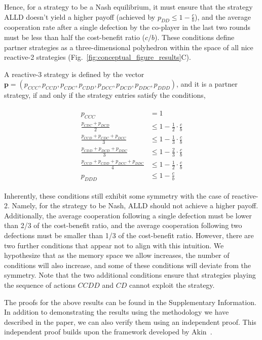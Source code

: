 \documentclass[11pt]{article}
\begin{document}
Hence, for a strategy to be a Nash equilibrium, it must ensure that the strategy
ALLD doesn't yield a higher payoff (achieved by $p_{DD} \leq 1 - \frac{c}{b}$),
and the average cooperation rate after a single defection by the co-player in
the last two rounds must be less than half the cost-benefit ratio ($c/b$). These
conditions define partner strategies as a three-dimensional polyhedron within
the space of all nice reactive-2 strategies
(Fig.~\ref{fig:conceptual_figure_results}C).

A reactive-3 strategy is defined by the vector $\mathbf{p} = (p_{CCC}, p_{CCD},
p_{CDC}, p_{CDD}, p_{DCC}, p_{DCD}, p_{DDC}, p_{DDD})$, and it is a partner strategy,
if and only if the strategy entries satisfy the conditions,

\begin{align}\label{eq:three_bit_conditions}
  \begin{split}
  p_{CCC} & = 1 \\
  \frac{p_{CDC} + p_{DCD}}{2} & \leq 1 - \frac{1}{2} \cdot \frac{c}{b} \\
  \frac{p_{CCD} + p_{CDC} + p_{DCC}}{3} & \leq 1 - \frac{1}{3} \cdot \frac{c}{b} \\
  \frac{p_{CDD} + p_{DCD} + p_{DDC}}{3} & \leq 1 - \frac{2}{3} \cdot \frac{c}{b} \\
  \frac{p_{CCD} + p_{CDD} + p_{DCC} + p_{DDC}}{4}  & \leq 1 - \frac{1}{2} \cdot \frac{c}{b}  \\
  p_{DDD} & \leq 1\!-\! \frac{c}{b}
  \end{split}
\end{align}

Inherently, these conditions still exhibit some symmetry with the case of
reactive-2. Namely, for the strategy to be Nash, ALLD should not achieve a
higher payoff. Additionally, the average cooperation following a single
defection must be lower than 2/3 of the cost-benefit ratio, and the average
cooperation following two defections must be smaller than 1/3 of the
cost-benefit ratio. However, there are two further conditions that appear not to
align with this intuition. We hypothesize that as the memory space we allow
increases, the number of conditions will also increase, and some of these
conditions will deviate from the symmetry. Note that the two additional conditions ensure
that strategies playing the sequence of actions $CCDD$ and $CD$ cannot exploit the
strategy.

The proofs for the above results can be found in the Supplementary Information.
In addition to demonstrating the results using the methodology we have described
in the paper, we can also verify them using an independent proof. This
independent proof builds upon the framework developed by
Akin~\cite{akin:EGADS:2016}.
\end{document}
